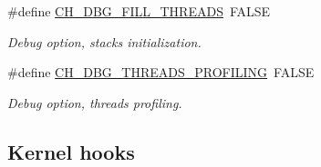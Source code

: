 \begin{DoxyCompactItemize}
\#define \hyperlink{group__config_ga6a859dd249adfb66b9bbf809061ea06c}{C\+H\+\_\+\+D\+B\+G\+\_\+\+F\+I\+L\+L\+\_\+\+T\+H\+R\+E\+A\+D\+S}~F\+A\+L\+S\+E
\begin{DoxyCompactList}\small\item\em Debug option, stacks initialization. \end{DoxyCompactList}\item 
\#define \hyperlink{group__config_gadc9c00c2e5b6e766ded8dfa77c0c90c1}{C\+H\+\_\+\+D\+B\+G\+\_\+\+T\+H\+R\+E\+A\+D\+S\+\_\+\+P\+R\+O\+F\+I\+L\+I\+N\+G}~F\+A\+L\+S\+E
\begin{DoxyCompactList}\small\item\em Debug option, threads profiling. \end{DoxyCompactList}\end{DoxyCompactItemize}
\subsection*{Kernel hooks}
